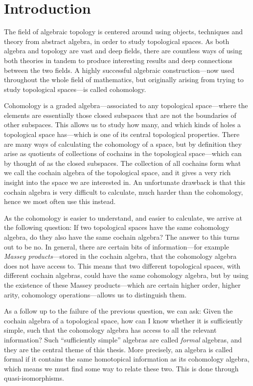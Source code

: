 
\section{Introduction}
\label{sec:introduction}

The field of algebraic topology is centered around using objects, techniques and theory from abstract algebra, in order to study topological spaces. As both algebra and topology are vast and deep fields, there are countless ways of using both theories in tandem to produce interesting results and deep connections between the two fields. A highly successful algebraic construction---now used throughout the whole field of mathematics, but originally arising from trying to study topological spaces---is called cohomology. 

Cohomology is a graded algebra---associated to any topological space---where the elements are essentially those closed subspaces that are not the boundaries of other subspaces. This allows us to study how many, and which kinds of holes a topological space has---which is one of its central topological properties. There are many ways of calculating the cohomology of a space, but by definition they arise as quotients of collections of cochains in the topological space---which can by thought of as the closed subspaces. The collection of all cochains form what we call the cochain algebra of the topological space, and it gives a very rich insight into the space we are interested in. An unfortunate drawback is that this cochain algebra is very difficult to calculate, much harder than the cohomology, hence we most often use this instead.

As the cohomology is easier to understand, and easier to calculate, we arrive at the following question: If two topological spaces have the same cohomology algebra, do they also have the same cochain algebra? The answer to this turns out to be no. In general, there are certain bits of information---for example \emph{Massey products}---stored in the cochain algebra, that the cohomology algebra does not have access to. This means that two different topological spaces, with different cochain algebras, could have the same cohomology algebra, but by using the existence of these Massey products---which are certain higher order, higher arity, cohomology operations---allows us to distinguish them. 

As a follow up to the failure of the previous question, we can ask: Given the cochain algebra of a topological space, how can I know whether it is sufficiently simple, such that the cohomology algebra has access to all the relevant information? Such ``sufficiently simple'' algebras are called \emph{formal} algebras, and they are the central theme of this thesis. More precisely, an algebra is called formal if it contains the same homotopical information as its cohomology algebra, which means we must find some way to relate these two. This is done through quasi-isomorphisms. 


